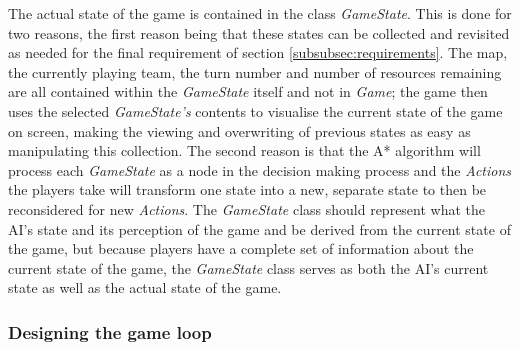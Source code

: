 \documentclass[11pt, a4paper]{article}
\begin{document}
The actual state of the game is contained in the class \emph{GameState}. This is done for two reasons, the first reason being that these states can be collected and revisited as needed for the final requirement of section \ref{subsubsec:requirements}. The map, the currently playing team, the turn number and number of resources remaining are all contained within the \emph{GameState} itself and not in \emph{Game}; the game then uses the selected \emph{GameState's} contents to visualise the current state of the game on screen, making the viewing and overwriting of previous states as easy as manipulating this collection. The second reason is that the A* algorithm will process each \emph{GameState} as a node in the decision making process and the \emph{Actions} the players take will transform one state into a new, separate state to then be reconsidered for new \emph{Actions}. The \emph{GameState} class should represent what the AI's state and its perception of the game and be derived from the current state of the game, but because players have a complete set of information about the current state of the game, the \emph{GameState} class serves as both the AI's current state as well as the actual state of the game.

\subsubsection{Designing the game loop}
\label{subsubsec:designingGameLoop}
\end{document}
